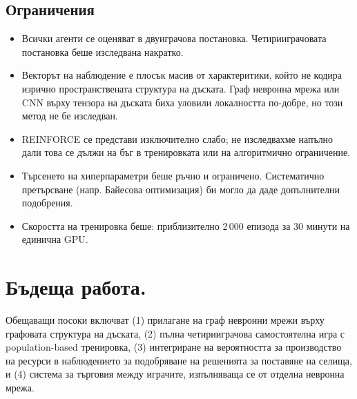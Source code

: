 \documentclass[11pt,a4paper]{article}
\newcommand{\eg}{{напр.}\xspace}
\begin{document}
\subsection{Ограничения}

\begin{itemize}[leftmargin=1.5em]
    \item Всички агенти се оценяват в двуиграчова постановка.
    Четирииграчовата постановка беше изследвана накратко.
    \item Векторът на наблюдение е плосък масив от характеритики,
    който не кодира изрично пространствената структура на дъската. Граф
    невронна мрежа или CNN върху тензора на дъската биха уловили локалността
    по-добре, но този метод не бе изследван.
    \item REINFORCE се представи изключително слабо; не изследвахме
    напълно дали това се дължи на бъг в тренировката или на алгоритмично
    ограничение.
    \item Търсенето на хиперпараметри беше ръчно и ограничено. Систематично
    претърсване (\eg Байесова оптимизация) би могло да даде допълнителни
    подобрения.
    \item Скоростта на тренировка беше: приблизително 2\,000
    епизода за 30 минути на единична GPU.
\end{itemize}

\section{Бъдеща работа.}
Обещаващи посоки включват (1) прилагане на граф невронни мрежи върху
графовата структура на дъската, (2) пълна четирииграчова самостоятелна игра
с population-based тренировка, (3) интегриране на вероятността за производство
на ресурси в наблюдението за подобряване на решенията за поставяне на
селища, и (4) система за търговия между играчите, изпълняваща се от отделна невронна мрежа.
\\
\\
\end{document}

